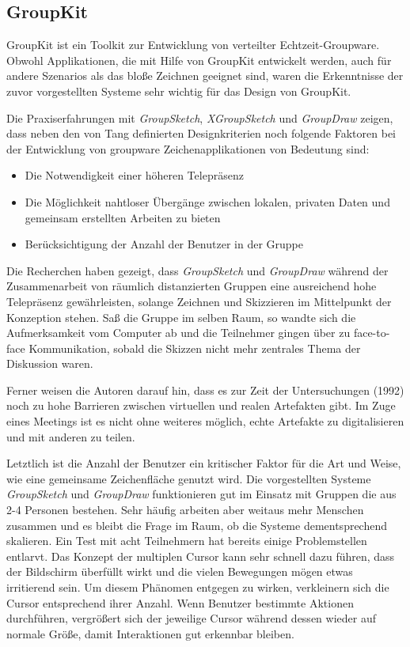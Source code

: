 \subsection{GroupKit}
GroupKit ist ein Toolkit zur Entwicklung von verteilter Echtzeit-Groupware. Obwohl Applikationen, die mit Hilfe von GroupKit entwickelt werden, auch für andere Szenarios als das bloße Zeichnen geeignet sind, waren die Erkenntnisse der zuvor vorgestellten Systeme sehr wichtig für das Design von GroupKit.

Die Praxiserfahrungen mit \emph{GroupSketch}, \emph{XGroupSketch} und \emph{GroupDraw} zeigen, dass neben den von Tang definierten Designkriterien \citep{TangJC:1989} noch folgende Faktoren bei der Entwicklung von groupware Zeichenapplikationen von Bedeutung sind:

\begin{itemize}
	\item
	Die Notwendigkeit einer höheren Telepräsenz
	\item
	Die Möglichkeit nahtloser Übergänge zwischen lokalen, privaten Daten und gemeinsam erstellten Arbeiten zu bieten
	\item
	Berücksichtigung der Anzahl der Benutzer in der Gruppe
\end{itemize}

Die Recherchen \citep{Greenberg:1992p207} haben gezeigt, dass \emph{GroupSketch} und \emph{GroupDraw} während der Zusammenarbeit von räumlich distanzierten Gruppen eine ausreichend hohe Telepräsenz gewährleisten, solange Zeichnen und Skizzieren im Mittelpunkt der Konzeption stehen. Saß die Gruppe im selben Raum, so wandte sich die Aufmerksamkeit vom Computer ab und die Teilnehmer gingen über zu face-to-face Kommunikation, sobald die Skizzen nicht mehr zentrales Thema der Diskussion waren. 

Ferner weisen die Autoren \citep{Greenberg:1992p207} darauf hin, dass es zur Zeit der Untersuchungen (1992) noch zu hohe Barrieren zwischen virtuellen und realen Artefakten gibt. Im Zuge eines Meetings ist es nicht ohne weiteres möglich, echte Artefakte zu digitalisieren und mit anderen zu teilen.

Letztlich ist die Anzahl der Benutzer ein kritischer Faktor für die Art und Weise, wie eine gemeinsame Zeichenfläche genutzt wird. Die vorgestellten Systeme \emph{GroupSketch} und \emph{GroupDraw} funktionieren gut im Einsatz mit Gruppen die aus 2-4 Personen bestehen. Sehr häufig arbeiten aber weitaus mehr Menschen zusammen und es bleibt die Frage im Raum, ob die Systeme dementsprechend skalieren. Ein Test mit acht Teilnehmern hat bereits einige Problemstellen entlarvt. Das Konzept der multiplen Cursor kann sehr schnell dazu führen, dass der Bildschirm überfüllt wirkt und die vielen Bewegungen mögen etwas irritierend sein. Um diesem Phänomen entgegen zu wirken, verkleinern sich die Cursor entsprechend ihrer Anzahl. Wenn Benutzer bestimmte Aktionen durchführen, vergrößert sich der jeweilige Cursor während dessen wieder auf normale Größe, damit Interaktionen gut erkennbar bleiben. 

